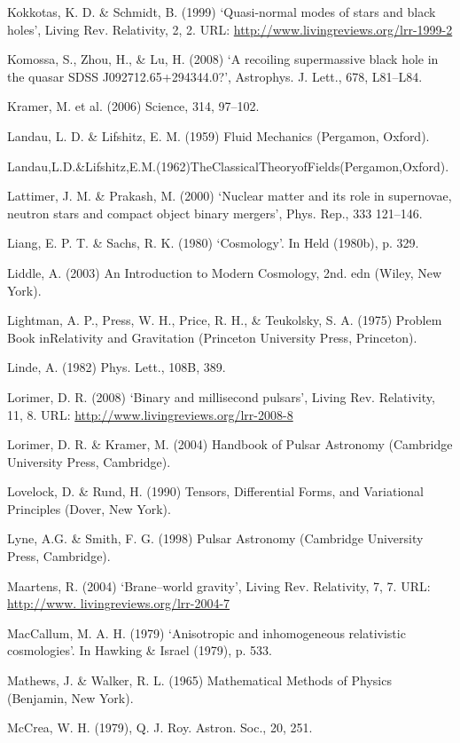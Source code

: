 {Kokkotas, K. D. \& Schmidt, B. (1999) ‘Quasi-normal modes of stars and black holes’, Living Rev. Relativity, 2, 2. URL: \url{http://www.livingreviews.org/lrr-1999-2}


Komossa, S., Zhou, H., \& Lu, H. (2008) ‘A recoiling supermassive black hole in the quasar SDSS J092712.65+294344.0?’, Astrophys. J. Lett., 678, L81–L84.


Kramer, M. et al. (2006) Science, 314, 97–102.


Landau, L. D. \& Lifshitz, E. M. (1959) Fluid Mechanics (Pergamon, Oxford).


Landau,L.D.\&Lifshitz,E.M.(1962)TheClassicalTheoryofFields(Pergamon,Oxford).


Lattimer, J. M. \& Prakash, M. (2000) ‘Nuclear matter and its role in supernovae, neutron stars and compact object binary mergers’, Phys. Rep., 333 121–146.


Liang, E. P. T. \& Sachs, R. K. (1980) ‘Cosmology’. In Held (1980b), p. 329.


Liddle, A. (2003) An Introduction to Modern Cosmology, 2nd. edn (Wiley, New York).


Lightman, A. P., Press, W. H., Price, R. H., \& Teukolsky, S. A. (1975) Problem Book inRelativity and Gravitation (Princeton University Press, Princeton).


Linde, A. (1982) Phys. Lett., 108B, 389.


Lorimer, D. R. (2008) ‘Binary and millisecond pulsars’, Living Rev. Relativity, 11, 8. URL: \url{http://www.livingreviews.org/lrr-2008-8}


Lorimer, D. R. \& Kramer, M. (2004) Handbook of Pulsar Astronomy (Cambridge University Press, Cambridge).


Lovelock, D. \& Rund, H. (1990) Tensors, Differential Forms, and Variational Principles (Dover, New York).


Lyne, A.G. \& Smith, F. G. (1998) Pulsar Astronomy (Cambridge University Press, Cambridge).


Maartens, R. (2004) ‘Brane–world gravity’, Living Rev. Relativity, 7, 7. URL: \url{http://www. livingreviews.org/lrr-2004-7}


MacCallum, M. A. H. (1979) ‘Anisotropic and inhomogeneous relativistic cosmologies’. In Hawking \& Israel (1979), p. 533.


Mathews, J. \& Walker, R. L. (1965) Mathematical Methods of Physics (Benjamin, New York).


McCrea, W. H. (1979), Q. J. Roy. Astron. Soc., 20, 251.


}
